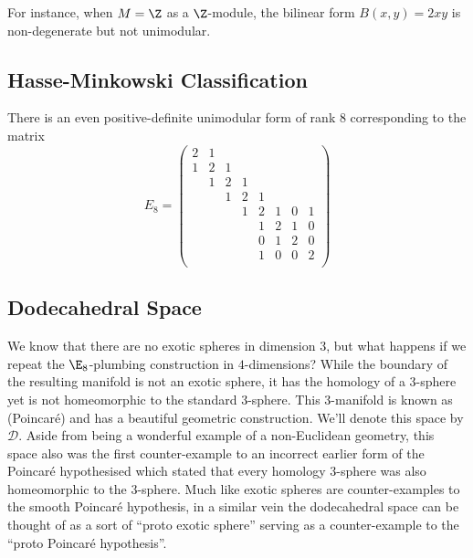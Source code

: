 \begin{example}
	For instance, when $M=\Z$ as a $\Z$-module, the bilinear form $B(x,y)=2xy$ is non-degenerate but not unimodular.
\end{example}

\subsection*{Hasse-Minkowski Classification}

\begin{proposition}
	There is an even positive-definite unimodular form of rank $8$ corresponding to the matrix
	\[
		E_8 = \begin{pmatrix}
			2 & 1 &   &   &   &   &   &   \\
			1 & 2 & 1 &   &   &   &   &   \\
			  & 1 & 2 & 1 &   &   &   &   \\
			  &   & 1 & 2 & 1 &   &   &   \\
			  &   &   & 1 & 2 & 1 & 0 & 1 \\
			  &   &   &   & 1 & 2 & 1 & 0 \\
			  &   &   &   & 0 & 1 & 2 & 0 \\
			  &   &   &   & 1 & 0 & 0 & 2 \\
		\end{pmatrix}
	\]
\end{proposition}

\subsection*{Dodecahedral Space}

We know that there are no exotic spheres in dimension $3$, but what happens if we repeat the $\E_8$-plumbing construction in $4$-dimensions? While the boundary of the resulting manifold is not an exotic sphere, it has the homology of a $3$-sphere yet is not homeomorphic to the standard $3$-sphere.
This $3$-manifold is known as (Poincar\'e)  and has a beautiful geometric construction. We'll denote this space by $\mathscr{D}$. Aside from being a wonderful example of a non-Euclidean geometry, this space also was the first counter-example to an incorrect earlier form of the Poincar\'e hypothesised which stated that every homology $3$-sphere was also homeomorphic to the $3$-sphere. Much like exotic spheres are counter-examples to the smooth Poincar\'e hypothesis, in a similar vein the dodecahedral space can be thought of as a sort of ``proto exotic sphere'' serving as a counter-example to the ``proto Poincar\'e hypothesis''.

